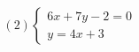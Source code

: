 \documentclass{book}
\begin{document}
\begin{Exercise}
\begin{Exercise}
\begin{minipage}{0.5\textwidth}
            \begin{displaymath}
                (2)\left\{ \begin{array}{ll}
                6x+7y-2=0\\
                y=4x+3
                \end{array} \right.
            \end{displaymath}

          \end{minipage}

        \end{Exercise}


      \end{Exercise}


\end{document}
